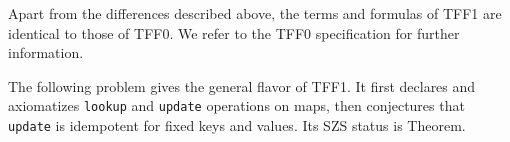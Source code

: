 %
%
%
%

 Apart from the differences described above,
the terms and formulas of TFF1 are identical to those of TFF0. We refer to the
TFF0 specification \cite{sutcliffe-et-al-2012-tff0} for further information.

 The following problem gives the general flavor of TFF1.
It first declares and axiomatizes {\tt lookup} and {\tt update} operations on
maps, then conjectures that {\tt update} is idempotent for fixed keys and
values. Its SZS status \cite{sutcliffe-2008-szs} is Theorem.

